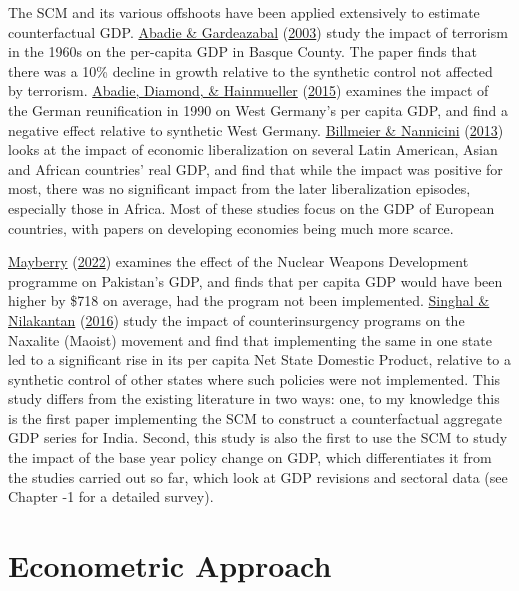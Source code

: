 \documentclass[12pt,nobind, a4paper]{reedthesis}
\begin{document}
 The SCM and its various offshoots have been applied extensively to estimate counterfactual GDP. \protect\hyperlink{ref-abadie_economic_2003}{Abadie \& Gardeazabal} (\protect\hyperlink{ref-abadie_economic_2003}{2003}) study the impact of terrorism in the 1960s on the per-capita GDP in Basque County. The paper finds that there was a 10\% decline in growth relative to the synthetic control not affected by terrorism. \protect\hyperlink{ref-abadie_comparative_2015}{Abadie, Diamond, \& Hainmueller} (\protect\hyperlink{ref-abadie_comparative_2015}{2015}) examines the impact of the German reunification in 1990 on West Germany's per capita GDP, and find a negative effect relative to synthetic West Germany. \protect\hyperlink{ref-billmeier_assessing_2013}{Billmeier \& Nannicini} (\protect\hyperlink{ref-billmeier_assessing_2013}{2013}) looks at the impact of economic liberalization on several Latin American, Asian and African countries' real GDP, and find that while the impact was positive for most, there was no significant impact from the later liberalization episodes, especially those in Africa. Most of these studies focus on the GDP of European countries, with papers on developing economies being much more scarce.
 \linebreak

 \protect\hyperlink{ref-mayberry_economic_2022}{Mayberry} (\protect\hyperlink{ref-mayberry_economic_2022}{2022}) examines the effect of the Nuclear Weapons Development programme on Pakistan's GDP, and finds that per capita GDP would have been higher by \$718 on average, had the program not been implemented. \protect\hyperlink{ref-singhal_economic_2016}{Singhal \& Nilakantan} (\protect\hyperlink{ref-singhal_economic_2016}{2016}) study the impact of counterinsurgency programs on the Naxalite (Maoist) movement and find that implementing the same in one state led to a significant rise in its per capita Net State Domestic Product, relative to a synthetic control of other states where such policies were not implemented. This study differs from the existing literature in two ways: one, to my knowledge this is the first paper implementing the SCM to construct a counterfactual aggregate GDP series for India. Second, this study is also the first to use the SCM to study the impact of the base year policy change on GDP, which differentiates it from the studies carried out so far, which look at GDP revisions and sectoral data (see Chapter -1 for a detailed survey).

 \hypertarget{econometric-approach}{%
 \section{Econometric Approach}\label{econometric-approach}}
\end{document}
